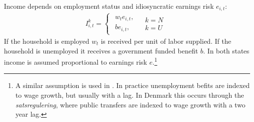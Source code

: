 Income depends on employment status and idiosyncratic earnings risk $e_{i,t}$:   
\begin{gather}
I_{i,t}^{k}=\begin{cases}
\begin{array}{c}
w_{t} e_{i,t} , \\
b e_{i,t},
\end{array} & \begin{array}{c}
k=N\\
k=U
\end{array}\end{cases}
\label{eq:Inc}
\end{gather}
If the household is employed $w_t$ is received per unit of labor supplied. If the household is unemployed it receives a government funded benefit $b$. In both states income is assumed proportional to earnings risk $e$.\footnote{A similar assumption is used in \citet{mckay2016role}. In practice unemployment befits are indexed to wage growth, but usually with a lag. In Denmark this occurs through the \textit{satsregulering}, where public transfers are indexed to wage growth with a two year lag.} 



